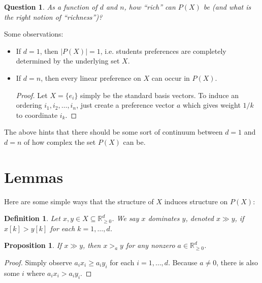 \documentclass[12pt]{article}
\newtheorem*{definition}{Definition}
\newtheorem*{question}{Question}
\newtheorem{proposition}[theorem]{Proposition}
\newcommand{\Rgz}{\mathbb{R}_{\ge 0}}
\newcommand{\1}[1]{\mathds{1}[{#1}]}
\begin{document}
  \begin{question}
    As a function of $d$ and $n$, how ``rich'' can $P(X)$ be
    (and what is the right notion of ``richness'')?
  \end{question}

  Some observations:
  \begin{itemize}
    \item If $d=1$, then $|P(X)| = 1$, i.e. students preferences are completely
      determined by the underlying set $X$.
    \item If $d=n$, then every linear preference on $X$ can occur in $P(X)$.
      \begin{proof}
        Let $X = \{e_i\}$ simply be the standard basis vectors.
        To induce an ordering $i_1, i_2, \ldots, i_n$, just create a preference
        vector $a$ which gives weight $1/k$ to coordinate $i_k$.
      \end{proof}
  \end{itemize}
  The above hints that there should be some sort of continuum between $d=1$
  and $d=n$ of how complex the set $P(X)$ can be.

\section{Lemmas}

  Here are some simple ways that the structure of $X$ induces structure on $P(X)$:

  \begin{definition}
    Let $x,y\in X\subseteq \Rgz^d$.
    We say $x$ \emph{dominates} $y$, denoted $x\gg y$,
    if $x[k] > y[k]$ for each $k=1,\ldots,d$.
  \end{definition}
  \begin{proposition}
    If $x \gg y$, then $x >_a y$ for any nonzero $a\in \Rgz^d$.
  \end{proposition}
  \begin{proof}
    Simply observe $a_i x_i \ge a_i y_i$ for each $i=1,\ldots, d$.
    Because $a\ne 0$, there is also some $i$ where $a_i x_i > a_i y_i$.
  \end{proof}
\end{document}
